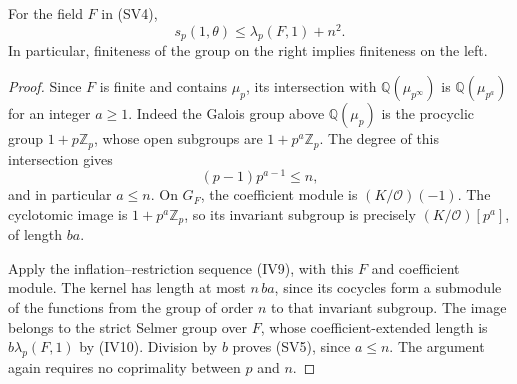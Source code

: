 \begin{lemma}\label{sv-restriction}
For the field $F$ in (SV4),
\[
                     s_p(1,\theta)\le\lambda_p(F,1)+n^2.
                                                               \tag{SV5}
\]
In particular, finiteness of the group on the right implies
finiteness on the left.
\end{lemma}
\begin{proof}
Since $F$ is finite and contains $\mu_p$, its intersection
with $\mathbb Q(\mu_{p^\infty})$ is
$\mathbb Q(\mu_{p^a})$ for an integer $a\ge1$.
Indeed the Galois group above $\mathbb Q(\mu_p)$ is the
procyclic group $1+p\mathbb Z_p$, whose open subgroups are
$1+p^a\mathbb Z_p$. The degree of this intersection gives
\[
                            (p-1)p^{a-1}\le n,
\]
and in particular $a\le n$. On $G_F$, the coefficient
module is $(K/\mathcal O)(-1)$. The cyclotomic image is
$1+p^a\mathbb Z_p$, so its invariant subgroup is precisely
$(K/\mathcal O)[p^a]$, of length $ba$.

Apply the inflation--restriction sequence (IV9), with this
$F$ and coefficient module. The kernel has length at most
$n\,ba$, since its cocycles form a submodule of the functions
from the group of order $n$ to that invariant subgroup.
The image belongs to the strict Selmer group over $F$,
whose coefficient-extended length is $b\lambda_p(F,1)$
by (IV10). Division by $b$ proves (SV5), since $a\le n$.
The argument again requires no coprimality between $p$ and $n$.
\end{proof}

